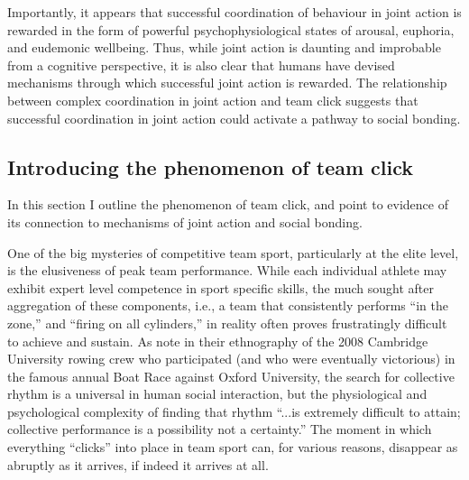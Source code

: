 \begin{CJK}{UTF8}{gbsn}
Importantly, it appears that successful coordination of behaviour in joint action is rewarded in the form of powerful psychophysiological states of arousal, euphoria, and eudemonic wellbeing.  Thus, while joint action is daunting and improbable from a cognitive perspective, it is also clear that humans have devised mechanisms through which successful joint action is rewarded. The relationship between complex coordination in joint action and team click suggests that successful coordination in joint action could activate a pathway to social bonding.


\subsection{Introducing the phenomenon of team click\label{sect:teamClickIntro}}
In this section I outline the phenomenon of team click, and point to evidence of its connection to mechanisms of joint action and social bonding.

One of the big mysteries of competitive team sport, particularly at the elite level, is the elusiveness of peak team performance.  While each individual athlete may exhibit expert level competence in sport specific skills, the much sought after aggregation of these components, i.e., a team that consistently performs ``in the zone,'' and ``firing on all cylinders,'' in reality often proves frustratingly difficult to achieve and sustain.  As \textcite[568]{King2011} note in their ethnography of the 2008 Cambridge University rowing crew who participated (and who were eventually victorious) in the famous annual Boat Race against Oxford University, the search for collective rhythm is a universal in human social interaction, but  the physiological and psychological complexity of finding that rhythm ``...is extremely difficult to attain; collective performance is a possibility not a certainty.''   The moment in which everything ``clicks'' into place in team sport can, for various reasons, disappear as abruptly as it arrives, if indeed it arrives at all.


\end{CJK}
